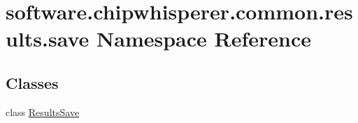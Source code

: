 \hypertarget{namespacesoftware_1_1chipwhisperer_1_1common_1_1results_1_1save}{}\section{software.\+chipwhisperer.\+common.\+results.\+save Namespace Reference}
\label{namespacesoftware_1_1chipwhisperer_1_1common_1_1results_1_1save}
\subsection*{Classes}
\begin{DoxyCompactItemize}
\item 
class \hyperlink{classsoftware_1_1chipwhisperer_1_1common_1_1results_1_1save_1_1ResultsSave}{Results\+Save}
\end{DoxyCompactItemize}
